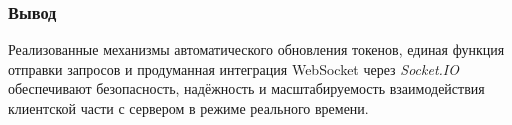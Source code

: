 \subsubsection*{Вывод}

Реализованные механизмы автоматического обновления токенов, единая функция отправки запросов и продуманная интеграция WebSocket через \textit{Socket.IO} обеспечивают безопасность, надёжность и масштабируемость взаимодействия клиентской части с сервером в режиме реального времени.
